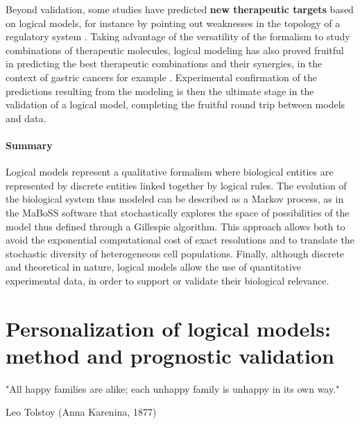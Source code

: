 \documentclass[a4paper,12pt,twoside,onecolumn,openright,final,oldfontcommands]{memoir}
\let\BeginKnitrBlock\begin \let\EndKnitrBlock\end
\begin{document}
Beyond validation, some studies have predicted \textbf{new therapeutic
targets} based on logical models, for instance by pointing out
weaknesses in the topology of a regulatory system
\citep{sahin2009modeling}. Taking advantage of the versatility of the
formalism to study combinations of therapeutic molecules, logical
modeling has also proved fruitful in predicting the best therapeutic
combinations and their synergies, in the context of gastric cancers for
example \citep{flobak2015discovery}. Experimental confirmation of the
predictions resulting from the modeling is then the ultimate stage in
the validation of a logical model, completing the fruitful round trip
between models and data.

\BeginKnitrBlock{conclubox}
\subsubsection*{Summary}\label{summary-3}

Logical models represent a qualitative formalism where biological
entities are represented by discrete entities linked together by logical
rules. The evolution of the biological system thus modeled can be
described as a Markov process, as in the MaBoSS software that
stochastically explores the space of possibilities of the model thus
defined through a Gillespie algorithm. This approach allows both to
avoid the exponential computational cost of exact resolutions and to
translate the stochastic diversity of heterogeneous cell populations.
Finally, although discrete and theoretical in nature, logical models
allow the use of quantitative experimental data, in order to support or
validate their biological relevance.
\EndKnitrBlock{conclubox}

\chapter{Personalization of logical models: method and prognostic
validation}\label{chap5}

\epigraph{"All happy families are alike; each unhappy family is unhappy in its own way."}{Leo Tolstoy (Anna Karenina, 1877)}
\end{document}
